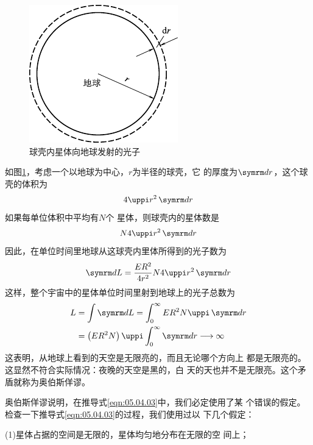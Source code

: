 \begin{figure}
  \centering
  \vspace{-2.5em}
  \includegraphics{figure/fig05.03}
  \caption{球壳内星体向地球发射的光子}
  \label{fig:05.03}
\end{figure}
如图\ref{fig:05.03}，考虑一个以地球为中心，$ r $为半径的球壳，它
的厚度为$ \dif r $，这个球壳的体积为
\begin{equation*}
  4 \uppi r ^ { 2 } \dif r
\end{equation*}%
如果每单位体积中平均有$ N $个
星体，则球壳内的星体数是
\begin{equation}\label{eqn:05.04.02}
  N 4 \uppi r ^ { 2 } \dif r
\end{equation}
因此，在单位时间里地球从这球壳内里体所得到的光子数为
\begin{equation*}
  \dif L = \frac { E R ^ { 2 } } { 4 r ^ { 2 } } N 4 \uppi r ^ { 2 } \dif r
\end{equation*}
这样，整个宇宙中的星体单位时间里射到地球上的光子总数为
\begin{equation}\label{eqn:05.04.03}
  \begin{aligned}
    L & = \int \dif L = \int _ 0 ^ { \infty } { E R ^ { 2 } N \uppi \dif r }                     \\
      & = \left( E R ^ { 2 } N \right) \uppi \int _ 0 ^ { \infty } \dif r \longrightarrow \infty
  \end{aligned}
\end{equation}
这表明，从地球上看到的天空是无限亮的，而且无论哪个方向上
都是无限亮的。这显然不符合实际情况：夜晚的天空是黑的，白
天的天也并不是无限亮。这个矛盾就称为奥伯斯佯谬。

奥伯斯佯谬说明，在推导式\eqref{eqn:05.04.03}中，我们必定使用了某
个错误的假定。检查一下推导式\eqref{eqn:05.04.03}的过程，我们使用过以
下几个假定：

(1)星体占据的空间是无限的，星体均匀地分布在无限的空
间上；


